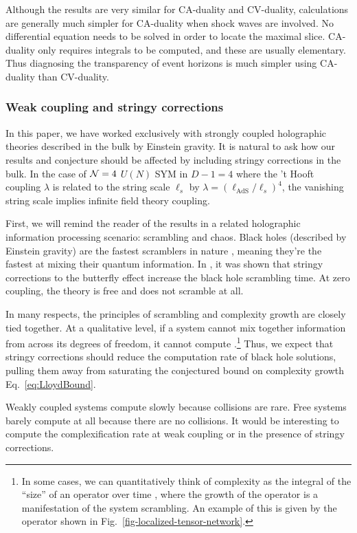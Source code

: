 \documentclass[12pt]{article}
\numberwithin{equation}{section}
\def\CN{{\cal N}}
\newcommand{\lads}{\ell_{\text{AdS}}}
\renewcommand{\eqref}[1]{Eq.~\ref{#1}}
\begin{document}
Although the results are very similar for CA-duality and CV-duality, calculations are generally much simpler for CA-duality when shock waves are involved. No differential equation needs to be solved in order to locate the maximal slice. CA-duality only requires integrals to be computed, and these are usually elementary. Thus diagnosing the  transparency of event horizons \cite{opacity} is much simpler using CA-duality than CV-duality.


\subsubsection{Weak coupling and stringy corrections}
In this paper, we have worked exclusively with strongly coupled holographic theories described in the bulk by Einstein gravity. It is natural to ask how our results and conjecture should be affected by including stringy corrections in the bulk.
In the case of $\CN=4$ $U(N)$ SYM in $D-1=4$ where the 't Hooft coupling $\lambda$ is related to the string scale $\ell_{s}$ by $\lambda = (\lads/\ell_{s})^4$, the vanishing string scale implies infinite field theory coupling.

First, we will remind the reader of the results in a related holographic information processing scenario: scrambling and chaos. Black holes (described by Einstein gravity) are the fastest scramblers in nature \cite{bhmirror,fastscramble,Maldacena:2015waa}, meaning they're the fastest at mixing their quantum information. In \cite{Shenker:2014cwa}, it was shown that stringy corrections to the butterfly effect increase the black hole scrambling time. At zero coupling, the theory is free and does not scramble at all.

In many respects, the principles of scrambling and complexity growth are closely tied together. At a qualitative level, if a system cannot  mix together information from across  its degrees of freedom, it cannot compute \cite{Hosur:2015ylk}.\footnote{In some cases, we can quantitatively think of complexity as the integral of the ``size'' of an operator over time \cite{localshocks}, where the growth of the operator is a manifestation of the system scrambling. An example of this is given by the operator shown in Fig.~\ref{fig-localized-tensor-network}.} Thus, we expect that stringy corrections should reduce the computation rate of black hole solutions, pulling them away from saturating the conjectured bound on complexity growth \eqref{eq:LloydBound}.

Weakly coupled systems compute slowly because collisions are rare. Free systems barely compute at all because there are no collisions. It would be interesting to compute the complexification rate at weak coupling or in the presence of stringy corrections.
\end{document}

